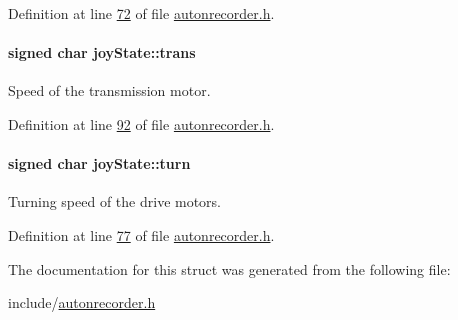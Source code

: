 Definition at line \hyperlink{autonrecorder_8h_source_l00072}{72} of file \hyperlink{autonrecorder_8h_source}{autonrecorder.\+h}.

\paragraph[{\texorpdfstring{trans}{trans}}]{\setlength{\rightskip}{0pt plus 5cm}signed char joy\+State\+::trans}\hypertarget{structjoy_state_acc4f7bae078e8c8b7840cda61382c7cf}{}\label{structjoy_state_acc4f7bae078e8c8b7840cda61382c7cf}
Speed of the transmission motor. 

Definition at line \hyperlink{autonrecorder_8h_source_l00092}{92} of file \hyperlink{autonrecorder_8h_source}{autonrecorder.\+h}.

\paragraph[{\texorpdfstring{turn}{turn}}]{\setlength{\rightskip}{0pt plus 5cm}signed char joy\+State\+::turn}\hypertarget{structjoy_state_aacdbb758b97190220423402f63020483}{}\label{structjoy_state_aacdbb758b97190220423402f63020483}
Turning speed of the drive motors. 

Definition at line \hyperlink{autonrecorder_8h_source_l00077}{77} of file \hyperlink{autonrecorder_8h_source}{autonrecorder.\+h}.



The documentation for this struct was generated from the following file\+:\begin{DoxyCompactItemize}
\item 
include/\hyperlink{autonrecorder_8h}{autonrecorder.\+h}\end{DoxyCompactItemize}
